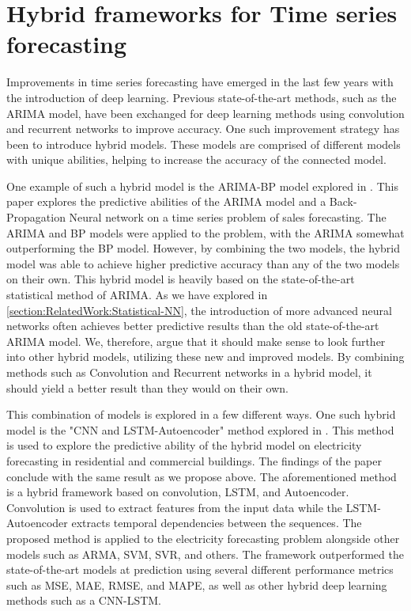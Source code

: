 \section{Hybrid frameworks for Time series forecasting}
\label{section:RelatedWork:Hybrid}

Improvements in time series forecasting have emerged in the last few years with the introduction of deep learning.
Previous state-of-the-art methods, such as the ARIMA model, have been exchanged for deep learning methods using convolution and recurrent networks to improve accuracy.
One such improvement strategy has been to introduce hybrid models.
These models are comprised of different models with unique abilities, helping to increase the accuracy of the connected model.


One example of such a hybrid model is the ARIMA-BP model explored in \cite{Bowen2020}.
This paper explores the predictive abilities of the ARIMA model and a Back-Propagation Neural network on a time series problem of sales forecasting.
The ARIMA and BP models were applied to the problem, with the ARIMA somewhat outperforming the BP model.
However, by combining the two models, the hybrid model was able to achieve higher predictive accuracy than any of the two models on their own.
This hybrid model is heavily based on the state-of-the-art statistical method of ARIMA.
As we have explored in \ref{section:RelatedWork:Statistical-NN}, the introduction of more advanced neural networks often achieves better predictive results than the old state-of-the-art ARIMA model.
We, therefore, argue that it should make sense to look further into other hybrid models, utilizing these new and improved models.
By combining methods such as Convolution and Recurrent networks in a hybrid model, it should yield a better result than they would on their own.


This combination of models is explored in a few different ways.
One such hybrid model is the "CNN and LSTM-Autoencoder" method explored in \cite{Khan2020}.
This method is used to explore the predictive ability of the hybrid model on electricity forecasting in residential and commercial buildings.
The findings of the paper conclude with the same result as we propose above.
The aforementioned method is a hybrid framework based on convolution, LSTM, and Autoencoder.
Convolution is used to extract features from the input data while the LSTM-Autoencoder extracts temporal dependencies between the sequences.
The proposed method is applied to the electricity forecasting problem alongside other models such as ARMA, SVM, SVR, and others.
The framework outperformed the state-of-the-art models at prediction using several different performance metrics such as MSE, MAE, RMSE, and MAPE,
as well as other hybrid deep learning methods such as a CNN-LSTM.


